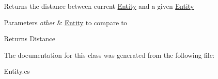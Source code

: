 Returns the distance between current \hyperlink{classffxivlib_1_1_entity}{Entity} and a given \hyperlink{classffxivlib_1_1_entity}{Entity} 


\begin{DoxyParams}{Parameters}
{\em other} & \hyperlink{classffxivlib_1_1_entity}{Entity} to compare to\\
\hline
\end{DoxyParams}
\begin{DoxyReturn}{Returns}
Distance
\end{DoxyReturn}


The documentation for this class was generated from the following file\-:\begin{DoxyCompactItemize}
\item 
Entity.\-cs\end{DoxyCompactItemize}
